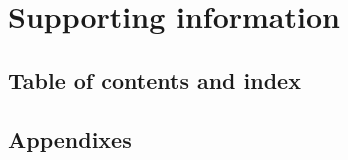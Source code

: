 \documentclass{article}
\begin{document}
\section{Supporting information}

\subsection{Table of contents and index}

\subsection{Appendixes}


\appendix
\end{document}

